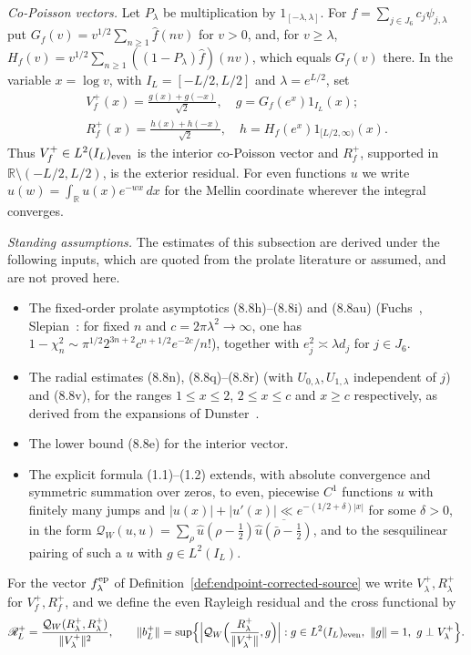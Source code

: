 \documentclass[11pt]{amsart}
\theoremstyle{definition}
\theoremstyle{remark}
\newcommand{\R}{\mathbb R}
\newcommand{\QW}{\mathcal Q_W}
\begin{document}
\emph{Co-Poisson vectors.}  Let \(P_\lambda\) be multiplication by
\(1_{[-\lambda,\lambda]}\).  For \(f=\sum_{j\in J_6}c_j\psi_{j,\lambda}\) put
\(G_f(v)=v^{1/2}\sum_{n\ge1}\widehat f(nv)\) for \(v>0\), and, for
\(v\ge\lambda\), \(H_f(v)=v^{1/2}\sum_{n\ge1}((1-P_\lambda)\widehat f)(nv)\),
which equals \(G_f(v)\) there.  In the variable \(x=\log v\), with
\(I_L=[-L/2,L/2]\) and \(\lambda=e^{L/2}\), set
\[
\begin{gathered}
 V_f^+(x)=\frac{g(x)+g(-x)}{\sqrt2},\quad g=G_f(e^x)1_{I_L}(x);\\
 R_f^+(x)=\frac{h(x)+h(-x)}{\sqrt2},\quad h=H_f(e^x)1_{[L/2,\infty)}(x).
\end{gathered}
\]
Thus \(V_f^+\in L^2(I_L)_{\rm even}\) is the interior co-Poisson vector
and \(R_f^+\), supported in \(\R\setminus(-L/2,L/2)\), is the exterior
residual.  For even functions \(u\) we write
\(\widehat u(w)=\int_\R u(x)e^{-wx}\,dx\) for the Mellin coordinate
wherever the integral converges.

\emph{Standing assumptions.}  The estimates of this subsection are
derived under the following inputs, which are quoted from the prolate
literature or assumed, and are not proved here.
\begin{itemize}
\item[(P1)] The fixed-order prolate asymptotics (8.8h)--(8.8i) and
(8.8au) (Fuchs~\cite{Fuchs1964}, Slepian~\cite{Slepian1965}: for fixed
\(n\) and \(c=2\pi\lambda^2\to\infty\), one has
\(1-\chi_n^2\sim\pi^{1/2}2^{3n+2}c^{n+1/2}e^{-2c}/n!\)), together with
\(e_j^2\asymp\lambda d_j\) for \(j\in J_6\).
\item[(P2)] The radial estimates (8.8n), (8.8q)--(8.8r) (with
\(U_{0,\lambda},U_{1,\lambda}\) independent of \(j\)) and (8.8v), for the
ranges \(1\le x\le2\), \(2\le x\le c\) and \(x\ge c\) respectively,
as derived from the expansions of Dunster~\cite{DunsterPSWF}.
\item[(P3)] The lower bound (8.8e) for the interior vector.
\item[(P4)] The explicit formula (1.1)--(1.2) extends, with absolute
convergence and symmetric summation over zeros, to even, piecewise
\(C^1\) functions \(u\) with finitely many jumps and
\(|u(x)|+|u'(x)|\ll e^{-(1/2+\delta)|x|}\) for some \(\delta>0\), in the form \(\QW(u,u)=\sum_\rho\widehat u(\rho-\tfrac12)
\overline{\widehat u(\bar\rho-\tfrac12)}\), and to the sesquilinear
pairing of such a \(u\) with \(g\in L^2(I_L)\).
\end{itemize}
For the vector \(f_\lambda^{\rm ep}\) of
Definition~\ref{def:endpoint-corrected-source} we write
\(V_\lambda^+,R_\lambda^+\) for \(V_f^+,R_f^+\), and we define the
even Rayleigh residual and the cross functional by
\[
 \mathscr R_L^+=\frac{\QW(R_\lambda^+,R_\lambda^+)}{\|V_\lambda^+\|^2},
 \qquad
 \|b_L^+\|=\sup\Bigl\{\Bigl|\QW\Bigl(\frac{R_\lambda^+}{\|V_\lambda^+\|},g\Bigr)\Bigr|:
 g\in L^2(I_L)_{\rm even},\ \|g\|=1,\ g\perp V_\lambda^+\Bigr\}.
\]
\end{document}
